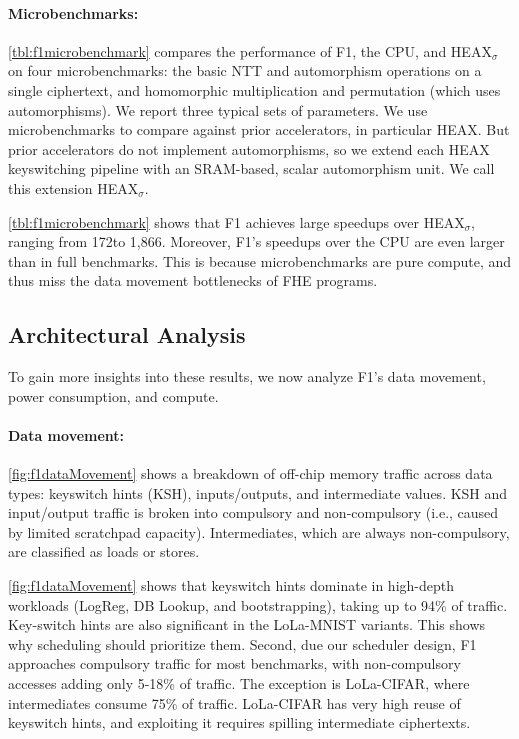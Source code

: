 \tblFOneMicrobenchmark

\paragraph{Microbenchmarks:}
\autoref{tbl:f1microbenchmark} compares the performance of F1, the CPU, and
HEAX$_\sigma$ on four microbenchmarks: the basic NTT and automorphism
operations on a single ciphertext, and homomorphic multiplication and
permutation (which uses automorphisms). We report three typical sets of
parameters. We use microbenchmarks to compare against prior accelerators, in
particular HEAX. But prior accelerators do not implement automorphisms, so we
extend each HEAX keyswitching pipeline with an SRAM-based, scalar automorphism
unit. We call this extension HEAX$_\sigma$.

\autoref{tbl:f1microbenchmark} shows that
F1 achieves large speedups over HEAX$_\sigma$, ranging from 172\x to 1,866\x.
Moreover, F1's speedups over the CPU are even larger than in full benchmarks.
This is because microbenchmarks are pure compute, and thus miss the data
movement bottlenecks of FHE programs.

\subsection{Architectural Analysis}

To gain more insights into these results, we now analyze F1's data movement,
power consumption, and compute.

\paragraph{Data movement:}
\autoref{fig:f1dataMovement} shows a breakdown of off-chip memory traffic
across data types: keyswitch hints (KSH), inputs/outputs, and intermediate
values. KSH and input/output traffic is broken into compulsory and
non-compulsory (i.e., caused by limited scratchpad capacity). Intermediates,
which are always non-compulsory, are classified as loads or stores.

\autoref{fig:f1dataMovement} shows that keyswitch hints dominate in high-depth
workloads (LogReg, DB Lookup, and bootstrapping), taking up to 94\% of traffic.
Key-switch hints are also significant in the LoLa-MNIST variants. This shows
why scheduling should prioritize them. Second, due our scheduler design, F1
approaches compulsory traffic for most benchmarks, with non\hyp{}compulsory
accesses adding only 5-18\% of traffic. The exception is LoLa-CIFAR, where
intermediates consume 75\% of traffic. LoLa-CIFAR has very high reuse of
keyswitch hints, and exploiting it requires spilling intermediate ciphertexts.

